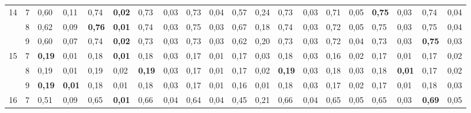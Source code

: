 \documentclass[conference]{IEEEtran}
\begin{document}
\begin{table}[]
\begin{tabular}{|cl|ll|ll|ll|ll|ll|ll|ll|ll|ll|}
		\multicolumn{1}{|c|}{\multirow{3}{*}{14}} & 7 & \multicolumn{1}{l|}{0,60} & 0,11 & \multicolumn{1}{l|}{0,74} & \textbf{0,02} & \multicolumn{1}{l|}{0,73} & 0,03 & \multicolumn{1}{l|}{0,73} & 0,04 & \multicolumn{1}{l|}{0,57} & 0,24 & \multicolumn{1}{l|}{0,73} & 0,03 & \multicolumn{1}{l|}{0,71} & 0,05 & \multicolumn{1}{l|}{\textbf{0,75}} & 0,03 & \multicolumn{1}{l|}{0,74} & 0,04 \\ \cline{2-20} 
		\multicolumn{1}{|c|}{} & 8 & \multicolumn{1}{l|}{0,62} & 0,09 & \multicolumn{1}{l|}{\textbf{0,76}} & \textbf{0,01} & \multicolumn{1}{l|}{0,74} & 0,03 & \multicolumn{1}{l|}{0,75} & 0,03 & \multicolumn{1}{l|}{0,67} & 0,18 & \multicolumn{1}{l|}{0,74} & 0,03 & \multicolumn{1}{l|}{0,72} & 0,05 & \multicolumn{1}{l|}{0,75} & 0,03 & \multicolumn{1}{l|}{0,75} & 0,04 \\ \cline{2-20} 
		\multicolumn{1}{|c|}{} & 9 & \multicolumn{1}{l|}{0,60} & 0,07 & \multicolumn{1}{l|}{0,74} & \textbf{0,02} & \multicolumn{1}{l|}{0,73} & 0,03 & \multicolumn{1}{l|}{0,73} & 0,03 & \multicolumn{1}{l|}{0,62} & 0,20 & \multicolumn{1}{l|}{0,73} & 0,03 & \multicolumn{1}{l|}{0,72} & 0,04 & \multicolumn{1}{l|}{0,73} & 0,03 & \multicolumn{1}{l|}{\textbf{0,75}} & 0,03 \\ \hline
		\multicolumn{1}{|c|}{\multirow{3}{*}{15}} & 7 & \multicolumn{1}{l|}{\textbf{0,19}} & 0,01 & \multicolumn{1}{l|}{0,18} & \textbf{0,01} & \multicolumn{1}{l|}{0,18} & 0,03 & \multicolumn{1}{l|}{0,17} & 0,01 & \multicolumn{1}{l|}{0,17} & 0,03 & \multicolumn{1}{l|}{0,18} & 0,03 & \multicolumn{1}{l|}{0,16} & 0,02 & \multicolumn{1}{l|}{0,17} & 0,01 & \multicolumn{1}{l|}{0,17} & 0,02 \\ \cline{2-20} 
		\multicolumn{1}{|c|}{} & 8 & \multicolumn{1}{l|}{0,19} & 0,01 & \multicolumn{1}{l|}{0,19} & 0,02 & \multicolumn{1}{l|}{\textbf{0,19}} & 0,03 & \multicolumn{1}{l|}{0,17} & 0,01 & \multicolumn{1}{l|}{0,17} & 0,02 & \multicolumn{1}{l|}{\textbf{0,19}} & 0,03 & \multicolumn{1}{l|}{0,18} & 0,03 & \multicolumn{1}{l|}{0,18} & \textbf{0,01} & \multicolumn{1}{l|}{0,17} & 0,02 \\ \cline{2-20} 
		\multicolumn{1}{|c|}{} & 9 & \multicolumn{1}{l|}{\textbf{0,19}} & \textbf{0,01} & \multicolumn{1}{l|}{0,18} & 0,01 & \multicolumn{1}{l|}{0,18} & 0,03 & \multicolumn{1}{l|}{0,17} & 0,01 & \multicolumn{1}{l|}{0,16} & 0,01 & \multicolumn{1}{l|}{0,18} & 0,03 & \multicolumn{1}{l|}{0,17} & 0,02 & \multicolumn{1}{l|}{0,17} & 0,01 & \multicolumn{1}{l|}{0,18} & 0,03 \\ \hline
		\multicolumn{1}{|c|}{\multirow{3}{*}{16}} & 7 & \multicolumn{1}{l|}{0,51} & 0,09 & \multicolumn{1}{l|}{0,65} & \textbf{0,01} & \multicolumn{1}{l|}{0,66} & 0,04 & \multicolumn{1}{l|}{0,64} & 0,04 & \multicolumn{1}{l|}{0,45} & 0,21 & \multicolumn{1}{l|}{0,66} & 0,04 & \multicolumn{1}{l|}{0,65} & 0,05 & \multicolumn{1}{l|}{0,65} & 0,03 & \multicolumn{1}{l|}{\textbf{0,69}} & 0,05 \\ \cline{2-20} 

\end{tabular}
\end{table}
\end{document}
